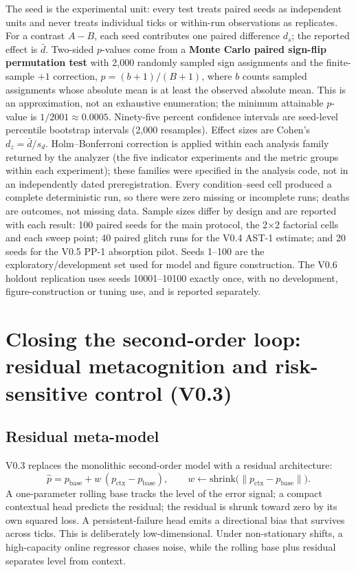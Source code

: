 \documentclass[11pt,a4paper]{article}
\begin{document}
The seed is the experimental unit: every test treats paired seeds as independent units and never treats
individual ticks or within-run observations as replicates. For a contrast $A-B$, each seed contributes
one paired difference $d_s$; the reported effect is $\bar d$. Two-sided $p$-values come from a
\textbf{Monte Carlo paired sign-flip permutation test} with 2{,}000 randomly sampled sign assignments
and the finite-sample $+1$ correction, $p=(b+1)/(B+1)$, where $b$ counts sampled assignments whose
absolute mean is at least the observed absolute mean. This is an approximation, not an exhaustive
enumeration; the minimum attainable $p$-value is $1/2001\approx0.0005$. Ninety-five percent confidence
intervals are seed-level percentile bootstrap intervals (2{,}000 resamples). Effect sizes are Cohen's
$d_z=\bar d/s_d$. Holm--Bonferroni correction is applied within each analysis family returned by the
analyzer (the five indicator experiments and the metric groups within each experiment); these families
were specified in the analysis code, not in an independently dated preregistration. Every
condition--seed cell produced a complete deterministic run, so there were zero missing or incomplete
runs; deaths are outcomes, not missing data. Sample sizes differ by design and are reported with each
result: 100 paired seeds for the main protocol, the 2$\times$2 factorial cells and each sweep point;
40 paired glitch runs for the V0.4 AST-1 estimate; and 20 seeds for the V0.5 PP-1 absorption pilot.
Seeds 1--100 are the exploratory/development set used for model and figure construction. The V0.6
holdout replication uses seeds 10001--10100 exactly once, with no development, figure-construction or
tuning use, and is reported separately.

\section{Closing the second-order loop: residual metacognition and risk-sensitive control (V0.3)}

\subsection{Residual meta-model}

V0.3 replaces the monolithic second-order model with a residual architecture:
\begin{equation}
\hat{p} = p_{\mathrm{base}} + w\,(p_{\mathrm{ctx}} - p_{\mathrm{base}}),
\qquad
w \leftarrow \mathrm{shrink}\bigl(\lVert p_{\mathrm{ctx}} - p_{\mathrm{base}}\rVert\bigr).
\end{equation}
A one-parameter rolling base tracks the level of the error signal; a compact contextual head predicts the residual; the residual is shrunk toward zero by its own squared loss. A persistent-failure head emits a directional bias that survives across ticks. This is deliberately low-dimensional. Under non-stationary shifts, a high-capacity online regressor chases noise, while the rolling base plus residual separates level from context.
\end{document}
